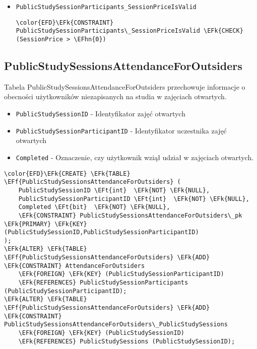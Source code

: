 \documentclass[11pt]{article}
\newcommand{\EFk}[1]{\textcolor{EFk}{\textbf{#1}}} %
\newcommand{\EFf}[1]{\textcolor{EFf}{#1}} %
\newcommand{\EFt}[1]{\textcolor{EFt}{\textbf{#1}}} %
\newcommand{\EFhn}[1]{\textcolor{EFhn}{#1}} %
\begin{document}
\begin{itemize}
\item \texttt{PublicStudySessionParticipants\_SessionPriceIsValid}
\begin{Code}
\begin{Verbatim}
\color{EFD}\EFk{CONSTRAINT} PublicStudySessionParticipants\_SessionPriceIsValid \EFk{CHECK}
(SessionPrice > \EFhn{0})
\end{Verbatim}
\end{Code}
\end{itemize}
\subsection{PublicStudySessionsAttendanceForOutsiders}
\label{sec:org17a5cc8}
Tabela PublicStudySessionsAttendanceForOutsiders przechowuje informacje o obecności użytkowników niezapisanych na studia w zajęciach otwartych.
\begin{itemize}
\item \texttt{PublicStudySessionID} - Identyfikator zajęć otwartych
\item \texttt{PublicStudySessionParticipantID} - Identyfikator uczestnika zajęć otwartych
\item \texttt{Completed} - Oznaczenie, czy użytkownik wziął udział w zajęciach otwartych.
\end{itemize}
\begin{Code}
\begin{Verbatim}
\color{EFD}\EFk{CREATE} \EFk{TABLE} \EFf{PublicStudySessionsAttendanceForOutsiders} (
    PublicStudySessionID \EFt{int}  \EFk{NOT} \EFk{NULL},
    PublicStudySessionParticipantID \EFt{int}  \EFk{NOT} \EFk{NULL},
    Completed \EFt{bit}  \EFk{NOT} \EFk{NULL},
    \EFk{CONSTRAINT} PublicStudySessionsAttendanceForOutsiders\_pk \EFk{PRIMARY} \EFk{KEY}  (PublicStudySessionID,PublicStudySessionParticipantID)
);
\EFk{ALTER} \EFk{TABLE} \EFf{PublicStudySessionsAttendanceForOutsiders} \EFk{ADD} \EFk{CONSTRAINT} AttendanceForOutsiders
    \EFk{FOREIGN} \EFk{KEY} (PublicStudySessionParticipantID)
    \EFk{REFERENCES} PublicStudySessionParticipants (PublicStudySessionParticipantID);
\EFk{ALTER} \EFk{TABLE} \EFf{PublicStudySessionsAttendanceForOutsiders} \EFk{ADD} \EFk{CONSTRAINT} PublicStudySessionsAttendanceForOutsiders\_PublicStudySessions
    \EFk{FOREIGN} \EFk{KEY} (PublicStudySessionID)
    \EFk{REFERENCES} PublicStudySessions (PublicStudySessionID);
\end{Verbatim}
\end{Code}
\end{document}
